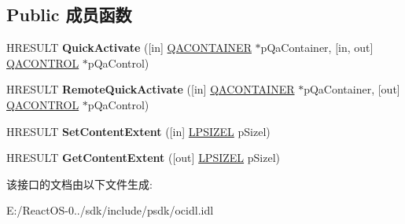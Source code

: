 \subsection*{Public 成员函数}
\begin{DoxyCompactItemize}
\item 
\mbox{\label{interface_i_quick_activate_aa7c89e6244a24c16e8d2dadb7d2dfd86}} 
H\+R\+E\+S\+U\+LT {\bfseries Quick\+Activate} (\mbox{[}in\mbox{]} \hyperlink{struct_i_quick_activate_1_1tag_q_a_c_o_n_t_a_i_n_e_r}{Q\+A\+C\+O\+N\+T\+A\+I\+N\+ER} $\ast$p\+Qa\+Container, \mbox{[}in, out\mbox{]} \hyperlink{struct_i_quick_activate_1_1tag_q_a_c_o_n_t_r_o_l}{Q\+A\+C\+O\+N\+T\+R\+OL} $\ast$p\+Qa\+Control)
\item 
\mbox{\label{interface_i_quick_activate_a9c213f3b59dfe2b1fd6c9397ecb14ee4}} 
H\+R\+E\+S\+U\+LT {\bfseries Remote\+Quick\+Activate} (\mbox{[}in\mbox{]} \hyperlink{struct_i_quick_activate_1_1tag_q_a_c_o_n_t_a_i_n_e_r}{Q\+A\+C\+O\+N\+T\+A\+I\+N\+ER} $\ast$p\+Qa\+Container, \mbox{[}out\mbox{]} \hyperlink{struct_i_quick_activate_1_1tag_q_a_c_o_n_t_r_o_l}{Q\+A\+C\+O\+N\+T\+R\+OL} $\ast$p\+Qa\+Control)
\item 
\mbox{\label{interface_i_quick_activate_ae7890d0a01881bbdc19acc86d28e0e85}} 
H\+R\+E\+S\+U\+LT {\bfseries Set\+Content\+Extent} (\mbox{[}in\mbox{]} \hyperlink{structtag_s_i_z_e}{L\+P\+S\+I\+Z\+EL} p\+Sizel)
\item 
\mbox{\label{interface_i_quick_activate_aecaed41aac69f6e97448421cd04dd453}} 
H\+R\+E\+S\+U\+LT {\bfseries Get\+Content\+Extent} (\mbox{[}out\mbox{]} \hyperlink{structtag_s_i_z_e}{L\+P\+S\+I\+Z\+EL} p\+Sizel)
\end{DoxyCompactItemize}


该接口的文档由以下文件生成\+:\begin{DoxyCompactItemize}
\item 
E\+:/\+React\+O\+S-\/0../sdk/include/psdk/ocidl.\+idl\end{DoxyCompactItemize}
